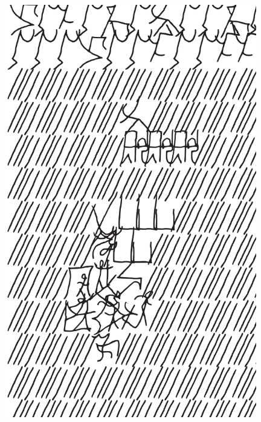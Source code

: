 \makeatletter\@openrightfalse
\movetooddpage
\begin{absolutelynopagebreak}
\begin{vplace}
\begin{figure}[H]
\begin{adjustwidth}{-0.99cm}{}
  \centering
  \vspace*{-1.77cm}
  \includegraphics[width=110mm]{./imgs/img12.pdf}  
  \hfill
\end{adjustwidth}

\thispagestyle{empty}

\end{figure}
\end{vplace}

\end{absolutelynopagebreak}

